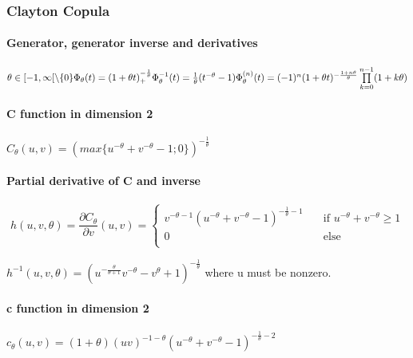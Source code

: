 \documentclass{article}
\begin{document}
   	
   	
   	\subsubsection{Clayton Copula}	
   \paragraph{Generator, generator inverse and derivatives}
   	\begin{math}
   		\theta \in  [-1,\infty[ \backslash \{ 0 \} \newline
   		\newline
   		\Phi_{\theta}(t)= (1+\theta t)_+^{-\frac{1}{\theta} }
   		\newline
   		\Phi_{\theta}^{-1}(t)=\frac{1}{\theta}(t^{-\theta}-1) \newline
   		\newline
   		\Phi_{\theta}^{(n)}(t) = (-1)^n (1+\theta t)^{-\frac{1+n \theta}{\theta}} \prod\limits_{k=0}^{n-1} (1 + k \theta)
   	\end{math}
   	
	\paragraph{C function in dimension 2}
   	\begin{math}
   		C_{\theta}(u,v) = (max\{u^{-\theta}+v^{-\theta}-1;0\})^{-\frac{1}{\theta}}
   	\end{math}
	\paragraph{Partial derivative of C and inverse}
   	\[
   		h(u,v,\theta)=\frac{\partial C_{\theta}}{\partial v} (u,v) = \begin{cases}
        v^{-\theta-1}(u^{-\theta}+v^{-\theta}-1)^{-\frac{1}{\theta}-1}  & \quad \text{if } u^{-\theta}+v^{-\theta} \geq 1 \\
    0  & \quad \text{else} \\
  \end{cases}
  \]
  
  	\begin{math}
  	h^{-1}(u,v,\theta) = (u^{-\frac{\theta}{\theta+1}}v^{-\theta}-v^{\theta}+1)^{-\frac{1}{\theta}}
	\end{math}
	where u must be nonzero.
	
	\paragraph{c function in dimension 2}
	\begin{math}
		c_\theta (u,v) = (1+\theta)(u v)^{-1-\theta}(u^{-\theta}+v^{-\theta}-1)^{-\frac{1}{\theta}-2}
	\end{math}	
\end{document}
